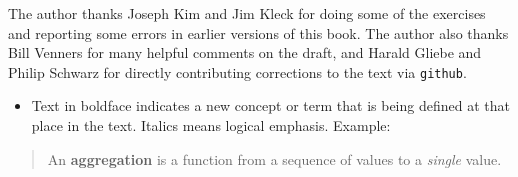 The author thanks Joseph Kim and Jim Kleck for doing some of the exercises
and reporting some errors in earlier versions of this book. The author
also thanks Bill Venners for many helpful comments on the draft, and
Harald Gliebe and Philip Schwarz for directly contributing corrections
to the text via \texttt{github}.

\begin{itemize}
\item Text in boldface indicates a new concept or term that is being defined
at that place in the text. Italics means logical emphasis. Example:
\end{itemize}
\begin{quotation}
An \textbf{aggregation} is a function from a sequence
of values to a \emph{single} value.
\end{quotation}
